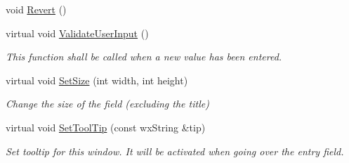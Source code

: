 \begin{DoxyCompactItemize}
void \mbox{\hyperlink{class_obj_cryst_1_1_w_x_field_string_a0372d3d98cad5236fc2ebb628c881600}{Revert}} ()
\item 
\mbox{\label{class_obj_cryst_1_1_w_x_field_string_ae206edd32f55a6f8b0425fa0b3afc84d}} 
virtual void \mbox{\hyperlink{class_obj_cryst_1_1_w_x_field_string_ae206edd32f55a6f8b0425fa0b3afc84d}{Validate\+User\+Input}} ()
\begin{DoxyCompactList}\small\item\em This function shall be called when a new value has been entered. \end{DoxyCompactList}\item 
\mbox{\label{class_obj_cryst_1_1_w_x_field_string_a1670cc6eb908057826372bd35a767a69}} 
virtual void \mbox{\hyperlink{class_obj_cryst_1_1_w_x_field_string_a1670cc6eb908057826372bd35a767a69}{Set\+Size}} (int width, int height)
\begin{DoxyCompactList}\small\item\em Change the size of the field (excluding the title) \end{DoxyCompactList}\item 
\mbox{\label{class_obj_cryst_1_1_w_x_field_string_af0a39f27941251c4e8dbd2decf7a21c7}} 
virtual void \mbox{\hyperlink{class_obj_cryst_1_1_w_x_field_string_af0a39f27941251c4e8dbd2decf7a21c7}{Set\+Tool\+Tip}} (const wx\+String \&tip)
\begin{DoxyCompactList}\small\item\em Set tooltip for this window. It will be activated when going over the entry field. \end{DoxyCompactList}\end{DoxyCompactItemize}
